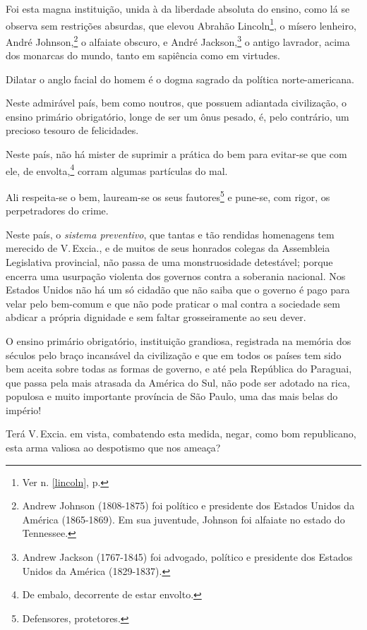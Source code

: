 Foi esta magna instituição, unida à da liberdade absoluta do ensino,
como lá se observa sem restrições absurdas, que elevou Abrahão
Lincoln\footnote{Ver n. \ref{lincoln}, p. \pageref{lincoln}}, o mísero 
lenheiro, André Johnson,\footnote{Andrew Johnson (1808-1875) foi político 
e presidente dos Estados Unidos da América (1865-1869). Em sua juventude, 
Johnson foi alfaiate no estado do Tennessee.} o alfaiate obscuro, e André
Jackson,\footnote{Andrew Jackson (1767-1845) foi advogado, político e
  presidente dos Estados Unidos da América (1829-1837).} o antigo
lavrador, acima dos monarcas do mundo, tanto em sapiência como em
virtudes.

Dilatar o anglo facial do homem é o dogma sagrado da política
norte-americana.

Neste admirável país, bem como noutros, que possuem adiantada
civilização, o ensino primário obrigatório, longe de ser um ônus pesado,
é, pelo contrário, um precioso tesouro de felicidades.

Neste país, não há mister de suprimir a prática do bem para evitar-se
que com ele, de envolta,\footnote{De embalo, decorrente de estar
  envolto.} corram algumas partículas do mal.

Ali respeita-se o bem, lauream-se os seus fautores\footnote{
  Defensores, protetores.} e pune-se, com rigor, os perpetradores do
crime.

Neste país, o \emph{sistema preventivo}, que tantas e tão rendidas
homenagens tem merecido de V.\,Excia., e de muitos de seus honrados
colegas da Assembleia Legislativa provincial, não passa de uma
monstruosidade detestável; porque encerra uma usurpação violenta dos
governos contra a soberania nacional. Nos Estados Unidos não há um só
cidadão que não saiba que o governo é pago para velar pelo bem-comum e
que não pode praticar o mal contra a sociedade sem abdicar a própria
dignidade e sem faltar grosseiramente ao seu dever.

O ensino primário obrigatório, instituição grandiosa, registrada na
memória dos séculos pelo braço incansável da civilização e que em todos
os países tem sido bem aceita sobre todas as formas de governo, e até
pela República do Paraguai, que passa pela mais atrasada da América do
Sul, não pode ser adotado na rica, populosa e muito importante província
de São Paulo, uma das mais belas do império!

Terá V.\,Excia. em vista, combatendo esta medida, negar, como bom
republicano, esta arma valiosa ao despotismo que nos ameaça?

